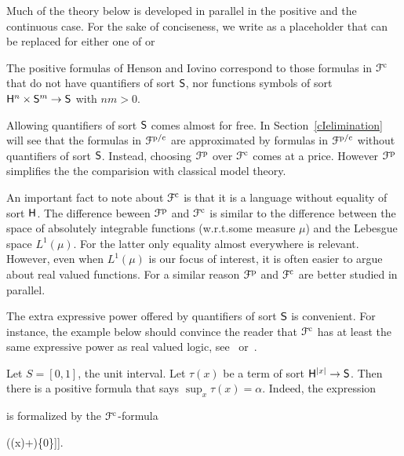 \documentclass{amsproc}
\def\dotminus{\stackon[.2ex]{$-$}{$.$}}
\renewcommand*{\emph}[1]{%
   \smash{\tikz[baseline]\node[rectangle, fill=teal!25, rounded corners, inner xsep=0.5ex, inner ysep=0.2ex, anchor=base, minimum height = 2.7ex]{\strut #1};}}
\begin{document}

\begin{notation}
  Much of the theory below is developed in parallel in the positive and the continuous case.
  For the sake of conciseness, we write \emph{p/c} as a placeholder that can be replaced for either one of \emph{p} or \emph{c.}
\end{notation}

The positive formulas of Henson and Iovino correspond to those formulas in ${\EuScript F}^{\rm c}$ that do not have quantifiers of sort ${\sf S}$, nor functions symbols of sort ${\sf H}^n\times{\sf S}^m\to {\sf S}$ with $nm>0$.

Allowing quantifiers of sort ${\sf S}$ comes almost for free.
In Section~\ref{cIelimination} will see that the formulas in ${\EuScript F}^{\rm p/c}$ are approximated by formulas in ${\EuScript F}^{\rm p/c}$ without quantifiers of sort ${\sf S}$.
Instead, choosing ${\EuScript F}^{\rm p}$ over ${\EuScript F}^{\rm c}$ comes at a price.
However ${\EuScript F}^{\rm p}$ simplifies the the comparision with classical model theory.

An important fact to note about ${\EuScript F}^{\rm c}$ is that it is a language without equality of sort ${\sf H}$.
The difference beween ${\EuScript F}^{\rm p}$ and ${\EuScript F}^{\rm c}$ is similar to the difference between the space of absolutely integrable functions (w.r.t.\@ some measure $\mu$) and the Lebesgue space $L^1(\mu)$.
For the latter only equality almost everywhere is relevant.
However, even when $L^1(\mu)$ is our focus of interest, it is often easier to argue about real valued functions.
For a similar reason ${\EuScript F}^{\rm p}$ and ${\EuScript F}^{\rm c}$ are better studied in parallel.

The extra expressive power offered by quantifiers of sort ${\sf S}$ is convenient.
For instance, the example below should convince the reader that ${\EuScript F}^{\rm c}$ has at least the same expressive power as real valued logic, see~\cite{BBHU} or~\cite{K}.%

\begin{example}\label{ex_Rvlogic}
  Let $S=[0,1]$, the unit interval.
  Let $\tau(x)$ be a term of sort ${\sf H}^{|x|}\to {\sf S}$.
  Then there is a positive formula that says $\sup_x \tau(x)=\alpha$.
  Indeed, the expression
  
  
  is formalized by the ${\EuScript F}^{\rm c}$-formula  

  \ceq{\hfill\forall x\ \big[\tau(x)\dotminus\alpha\in\{0\}\big]}
  {\wedge}{\forall \varepsilon \Big[\varepsilon\in\{0\}\ \vee\ \exists x\ \big[\alpha\dotminus (\tau(x)+\varepsilon)\in\{0\}\big]\Big].}
\end{example}
\end{document}

